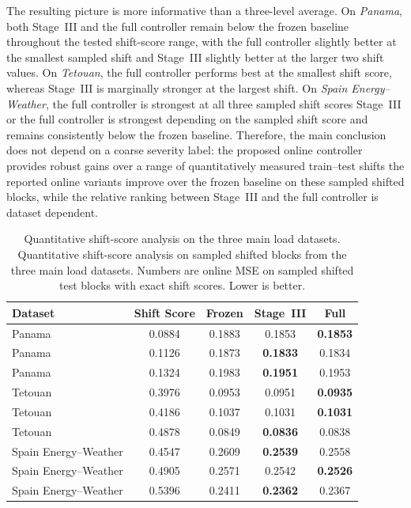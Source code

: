 ﻿\documentclass[journal]{IEEEtran}
\DeclareRobustCommand{\oldtext}[1]{{\color{revisionred}#1}}
\DeclareRobustCommand{\newtext}[1]{{\color{revisionblue}#1}}
\DeclareRobustCommand{\why}[1]{{\color{revisionblue}{\footnotesize (#1)}}}
\DeclareRobustCommand{\rw}[3]{\oldtext{#1} \newtext{#2}\why{#3}}
\begin{document}
The resulting picture is more informative than a three-level average. On \textit{Panama}, both Stage~III and the full controller remain below the frozen baseline throughout the tested shift-score range, with the full controller slightly better at the smallest sampled shift and Stage~III slightly better at the larger two shift values. On \textit{Tetouan}, the full controller performs best at the smallest shift score, whereas Stage~III is marginally stronger at the largest shift. On \textit{Spain Energy--Weather}, \rw{the full controller is strongest at all three sampled shift scores}{Stage~III or the full controller is strongest depending on the sampled shift score}{修正文表不一致，Spain 第一和第三行 Stage III 更低。} and remains consistently below the frozen baseline. Therefore, the main conclusion does not depend on a coarse severity label: \rw{the proposed online controller provides robust gains over a range of quantitatively measured train--test shifts}{the reported online variants improve over the frozen baseline on these sampled shifted blocks}{避免 robust/range 过强且无不确定性。}, while the relative ranking between Stage~III and the full controller is dataset dependent.

\begin{table}[t]
\caption{\rw{Quantitative shift-score analysis on the three main load datasets.}{Quantitative shift-score analysis on sampled shifted blocks from the three main load datasets.}{说明采样块范围。} Numbers are online MSE on sampled shifted test blocks with exact shift scores. Lower is better.}
\label{tab:shift_score_quantitative}
\centering
\begin{tabular}{lcccc}
\toprule
Dataset & Shift Score & Frozen & Stage~III & Full \\
\midrule
Panama & 0.0884 & 0.1883 & 0.1853 & \textbf{0.1853} \\
Panama & 0.1126 & 0.1873 & \textbf{0.1833} & 0.1834 \\
Panama & 0.1324 & 0.1983 & \textbf{0.1951} & 0.1953 \\
Tetouan & 0.3976 & 0.0953 & 0.0951 & \textbf{0.0935} \\
Tetouan & 0.4186 & 0.1037 & 0.1031 & \textbf{0.1031} \\
Tetouan & 0.4878 & 0.0849 & \textbf{0.0836} & 0.0838 \\
Spain Energy--Weather & 0.4547 & 0.2609 & \textbf{0.2539} & 0.2558 \\
Spain Energy--Weather & 0.4905 & 0.2571 & 0.2542 & \textbf{0.2526} \\
Spain Energy--Weather & 0.5396 & 0.2411 & \textbf{0.2362} & 0.2367 \\
\bottomrule
\end{tabular}
\end{table}
\end{document}

